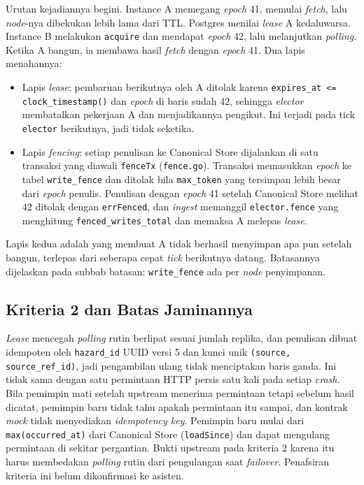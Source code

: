 Urutan kejadiannya begini. Instance A memegang \textit{epoch} 41, memulai \textit{fetch}, lalu \textit{node}-nya dibekukan lebih lama dari TTL. Postgres menilai \textit{lease} A kedaluwarsa. Instance B melakukan \texttt{acquire} dan mendapat \textit{epoch} 42, lalu melanjutkan \textit{polling}. Ketika A bangun, ia membawa hasil \textit{fetch} dengan \textit{epoch} 41. Dua lapis menahannya:

\begin{itemize}
\item Lapis \textit{lease}: pembaruan berikutnya oleh A ditolak karena \texttt{expires\_at <= clock\_timestamp()} dan \textit{epoch} di baris sudah 42, sehingga \textit{elector} membatalkan pekerjaan A dan menjadikannya pengikut. Ini terjadi pada tick \texttt{elector} berikutnya, jadi tidak seketika.
\item Lapis \textit{fencing}: setiap penulisan ke Canonical Store dijalankan di satu transaksi yang diawali \texttt{fenceTx} (\texttt{fence.go}). Transaksi memasukkan \textit{epoch} ke tabel \texttt{write\_fence} dan ditolak bila \texttt{max\_token} yang tersimpan lebih besar dari \textit{epoch} penulis. Penulisan dengan \textit{epoch} 41 setelah Canonical Store melihat 42 ditolak dengan \texttt{errFenced}, dan \textit{ingest} memanggil \texttt{elector.fence} yang menghitung \texttt{fenced\_writes\_total} dan memaksa A melepas \textit{lease}.
\end{itemize}

Lapis kedua adalah yang membuat A tidak berhasil menyimpan apa pun setelah bangun, terlepas dari seberapa cepat \textit{tick} berikutnya datang. Batasannya dijelaskan pada subbab batasan: \texttt{write\_fence} ada per \textit{node} penyimpanan.

\subsection{Kriteria 2 dan Batas Jaminannya}

\textit{Lease} mencegah \textit{polling} rutin berlipat sesuai jumlah replika, dan penulisan dibuat idempoten oleh \texttt{hazard\_id} UUID versi 5 dan kunci unik \texttt{(source, source\_ref\_id)}, jadi pengambilan ulang tidak menciptakan baris ganda. Ini tidak sama dengan satu permintaan HTTP persis satu kali pada setiap \textit{crash}. Bila pemimpin mati setelah upstream menerima permintaan tetapi sebelum hasil dicatat, pemimpin baru tidak tahu apakah permintaan itu sampai, dan kontrak \textit{mock} tidak menyediakan \textit{idempotency key}. Pemimpin baru mulai dari \texttt{max(occurred\_at)} dari Canonical Store (\texttt{loadSince}) dan dapat mengulang permintaan di sekitar pergantian. Bukti upstream pada kriteria 2 karena itu harus membedakan \textit{polling} rutin dari pengulangan saat \textit{failover}. Penafsiran kriteria ini belum dikonfirmasi ke asisten.

